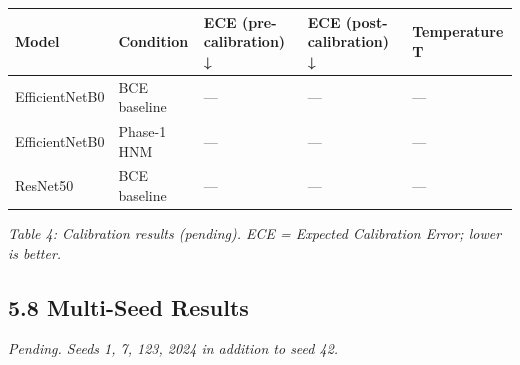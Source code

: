 \documentclass[
  11pt,
]{article}
\newcounter{none} %
\begin{document}
{\def\LTcaptype{none} %
\begin{longtable}[]{@{}
  >{\raggedright\arraybackslash}p{}
  >{\raggedright\arraybackslash}p{}
  >{\raggedright\arraybackslash}p{}
  >{\raggedright\arraybackslash}p{}
  >{\raggedright\arraybackslash}p{}@{}}
\toprule\noalign{}
\begin{minipage}[b]{\linewidth}\raggedright
Model
\end{minipage} & \begin{minipage}[b]{\linewidth}\raggedright
Condition
\end{minipage} & \begin{minipage}[b]{\linewidth}\raggedright
ECE (pre-calibration) ↓
\end{minipage} & \begin{minipage}[b]{\linewidth}\raggedright
ECE (post-calibration) ↓
\end{minipage} & \begin{minipage}[b]{\linewidth}\raggedright
Temperature T
\end{minipage} \\
\midrule\noalign{}
\endhead
\bottomrule\noalign{}
\endlastfoot
EfficientNetB0 & BCE baseline & --- & --- & --- \\
EfficientNetB0 & Phase-1 HNM & --- & --- & --- \\
ResNet50 & BCE baseline & --- & --- & --- \\
\end{longtable}
}

\emph{Table 4: Calibration results (pending). ECE = Expected Calibration
Error; lower is better.}

\subsection{5.8 Multi-Seed Results}\label{multi-seed-results}

\emph{Pending. Seeds 1, 7, 123, 2024 in addition to seed 42.}
\end{document}
